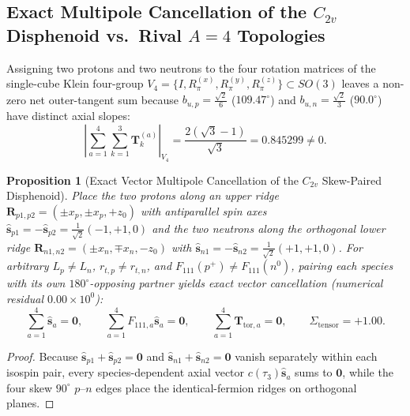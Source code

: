 \documentclass[11pt, a4paper]{article}
\newtheorem{proposition}[theorem]{Proposition}
\begin{document}
\subsection{\texorpdfstring{Exact Multipole Cancellation of the $C_{2v}$ Disphenoid vs.\ Rival $A = 4$ Topologies}{Exact Multipole Cancellation of the C2v Disphenoid vs. Rival A = 4 Topologies}}
Assigning two protons and two neutrons to the four rotation matrices of the single-cube Klein four-group $V_4 = \{I, R_\pi^{(x)}, R_\pi^{(y)}, R_\pi^{(z)}\} \subset SO(3)$ leaves a non-zero net outer-tangent sum because $b_{u,p} = \frac{\sqrt{2}}{6}$ ($109.47^\circ$) and $b_{u,n} = \frac{\sqrt{2}}{3}$ ($90.0^\circ$) have distinct axial slopes:
\begin{equation}
    \left|\sum_{a=1}^4\sum_{k=1}^3 \mathbf{T}_k^{(a)}\right|_{V_4} = \frac{2(\sqrt{3} - 1)}{\sqrt{3}} = \mathbf{0.845299} \neq 0.
    \label{eq:v4_tangent_leak}
\end{equation}

\begin{proposition}[Exact Vector Multipole Cancellation of the $C_{2v}$ Skew-Paired Disphenoid]
\label{prop:c2v_disphenoid}
Place the two protons along an upper ridge $\mathbf{R}_{p1,p2} = (\pm x_p, \pm x_p, +z_0)$ with antiparallel spin axes $\hat{\mathbf{s}}_{p1} = -\hat{\mathbf{s}}_{p2} = \frac{1}{\sqrt{2}}(-1,+1,0)$ and the two neutrons along the orthogonal lower ridge $\mathbf{R}_{n1,n2} = (\pm x_n, \mp x_n, -z_0)$ with $\hat{\mathbf{s}}_{n1} = -\hat{\mathbf{s}}_{n2} = \frac{1}{\sqrt{2}}(+1,+1,0)$. For arbitrary $L_p \neq L_n$, $r_{t,p} \neq r_{t,n}$, and $F_{111}(p^+) \neq F_{111}(n^0)$, pairing each species with its own $180^\circ$-opposing partner yields exact vector cancellation (numerical residual $0.00 \times 10^0$):
\begin{equation}
    \sum_{a=1}^4 \hat{\mathbf{s}}_a = \mathbf{0}, \qquad
    \sum_{a=1}^4 F_{111,a}\hat{\mathbf{s}}_a = \mathbf{0}, \qquad
    \sum_{a=1}^4 \mathbf{T}_{\mathrm{tor},a} = \mathbf{0}, \qquad
    \Sigma_{\mathrm{tensor}} = +1.00.
    \label{eq:c2v_exact_nulls}
\end{equation}
\end{proposition}

\begin{proof}
Because $\hat{\mathbf{s}}_{p1} + \hat{\mathbf{s}}_{p2} = \mathbf{0}$ and $\hat{\mathbf{s}}_{n1} + \hat{\mathbf{s}}_{n2} = \mathbf{0}$ vanish separately within each isospin pair, every species-dependent axial vector $c(\tau_3)\hat{\mathbf{s}}_a$ sums to $\mathbf{0}$, while the four skew $90^\circ$ $p\text{--}n$ edges place the identical-fermion ridges on orthogonal planes.
\end{proof}
\end{document}
